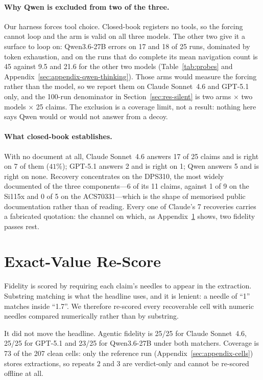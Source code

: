 \documentclass[11pt]{article}
\begin{document}
\paragraph{Why Qwen is excluded from two of the three.}
Our harness forces tool choice. Closed-book registers no tools, so the
forcing cannot loop and the arm is valid on all three models. The other
two give it a surface to loop on: Qwen3.6-27B errors on 17 and 18 of 25
runs, dominated by token exhaustion, and on the runs that do complete
its mean navigation count is 45 against 9.5 and 21.6 for the other two
models (Table~\ref{tab:probes} and
Appendix~\ref{sec:appendix-qwen-thinking}). Those arms would measure the
forcing rather than the model, so we report them on Claude Sonnet~4.6
and GPT-5.1 only, and the 100-run denominator in
Section~\ref{sec:res-silent} is two arms $\times$ two models $\times$ 25
claims. The exclusion is a coverage limit, not a result: nothing here
says Qwen would or would not answer from a decoy.

\paragraph{What closed-book establishes.}
With no document at all, Claude Sonnet~4.6 answers 17 of 25 claims and
is right on 7 of them ($41\%$); GPT-5.1 answers 2 and is right on 1;
Qwen answers 5 and is right on none. Recovery concentrates on the
DPS310, the most widely documented of the three components---6 of its 11
claims, against 1 of 9 on the Si115x and 0 of 5 on the ACS70331---which
is the shape of memorised public documentation rather than of reading.
Every one of Claude's 7 recoveries carries a fabricated quotation: the
channel on which, as Appendix~\ref{sec:appendix-rescore} shows, two
fidelity passes rest.

\section{Exact-Value Re-Score}
\label{sec:appendix-rescore}

Fidelity is scored by requiring each claim's needles to appear in the
extraction. Substring matching is what the headline uses, and it is
lenient: a needle of ``1'' matches inside ``1.7''. We therefore re-scored
every recoverable cell with numeric needles compared numerically rather
than by substring.

It did not move the headline. Agentic fidelity is 25/25 for Claude
Sonnet~4.6, 25/25 for GPT-5.1 and 23/25 for Qwen3.6-27B under both
matchers. Coverage is 73 of the 207 clean cells: only the reference run
(Appendix~\ref{sec:appendix-cells}) stores extractions, so repeats 2 and 3 are verdict-only and cannot be
re-scored offline at all.
\end{document}
